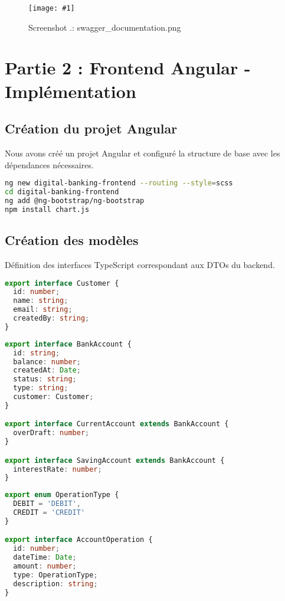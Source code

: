 \documentclass[12pt,a4paper]{report}
\newcounter{screenshotcounter}[chapter]
\newcommand{\screenshot}[2]{
  \stepcounter{screenshotcounter}
  \begin{figure}[H]
    \centering
    \texttt{[image: \#1]}
    \caption{Screenshot \thechapter.\thescreenshotcounter: #1}
    \label{fig:#1}
  \end{figure}
}
\begin{document}
\screenshot{swagger_documentation.png}{0.8} %

\chapter{Partie 2 : Frontend Angular - Implémentation}

\section{Création du projet Angular}
Nous avons créé un projet Angular et configuré la structure de base avec les dépendances nécessaires.

\begin{lstlisting}[language=bash, caption=Création du projet Angular]
ng new digital-banking-frontend --routing --style=scss
cd digital-banking-frontend
ng add @ng-bootstrap/ng-bootstrap
npm install chart.js
\end{lstlisting}

\section{Création des modèles}
Définition des interfaces TypeScript correspondant aux DTOs du backend.

\begin{lstlisting}[language=TypeScript, caption=customer.model.ts]
export interface Customer {
  id: number;
  name: string;
  email: string;
  createdBy: string;
}
\end{lstlisting}

\begin{lstlisting}[language=TypeScript, caption=account.model.ts]
export interface BankAccount {
  id: string;
  balance: number;
  createdAt: Date;
  status: string;
  type: string;
  customer: Customer;
}

export interface CurrentAccount extends BankAccount {
  overDraft: number;
}

export interface SavingAccount extends BankAccount {
  interestRate: number;
}
\end{lstlisting}

\begin{lstlisting}[language=TypeScript, caption=operation.model.ts]
export enum OperationType {
  DEBIT = 'DEBIT',
  CREDIT = 'CREDIT'
}

export interface AccountOperation {
  id: number;
  dateTime: Date;
  amount: number;
  type: OperationType;
  description: string;
}
\end{lstlisting}
\end{document}
